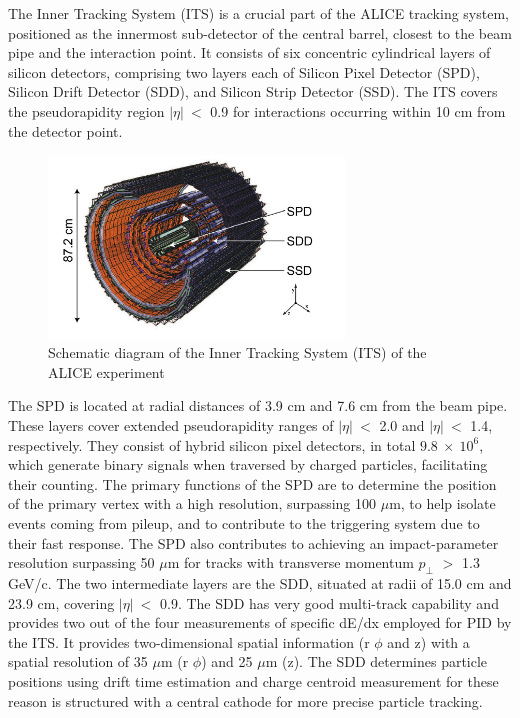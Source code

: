 \documentclass[12pt,a4paper]{book}
\begin{document}
 The Inner Tracking System (ITS) is a crucial part of the ALICE tracking system, positioned as the innermost sub-detector of the central barrel, closest to the beam pipe and the interaction point. It consists of six concentric cylindrical layers of silicon detectors, comprising two layers each of Silicon Pixel Detector (SPD), Silicon Drift Detector (SDD), and Silicon Strip Detector (SSD). The ITS covers the pseudorapidity region $|\eta|\ <$ 0.9 for interactions occurring within 10 cm from the detector point.
\begin{figure}[h]
	\centering
	\includegraphics[width=0.7\textwidth]{pictures/ITS_schematic.png}
	\caption{Schematic diagram of the Inner Tracking System (ITS) of the ALICE experiment \cite{collaboration_2010}}
	\label{fig:ITS_schematic}
\end{figure}
The  SPD is located at radial distances of 3.9 cm and 7.6 cm from the beam pipe. These layers cover extended pseudorapidity ranges of $|\eta|\ <$ 2.0 and $|\eta|\ <$ 1.4, respectively. They consist of hybrid silicon pixel detectors, in total $9.8 \ × \ 10^6$, which generate binary signals when traversed by charged particles, facilitating their counting. The primary functions of the SPD are to determine the position of the primary vertex with a high resolution, surpassing 100 $\mu$m, to help isolate events coming from pileup, and to contribute to the triggering system due to their fast response. The SPD also contributes to achieving an impact-parameter resolution surpassing 50 $\mu$m for tracks with transverse momentum $p_\perp$ $>$ 1.3 GeV/c.
The two intermediate layers are the SDD, situated at radii of 15.0 cm and 23.9 cm, covering $|\eta|\ <$ 0.9. The SDD has very good multi-track capability and provides two out of the four measurements of specific dE/dx employed for PID by the ITS. It provides two-dimensional spatial information (r $\phi$ and z) with a spatial resolution of 35 $\mu$m (r $\phi$) and 25 $\mu$m (z). The SDD determines particle positions using drift time estimation and charge centroid measurement for these reason is structured with a central cathode for more precise particle tracking.
\end{document}
